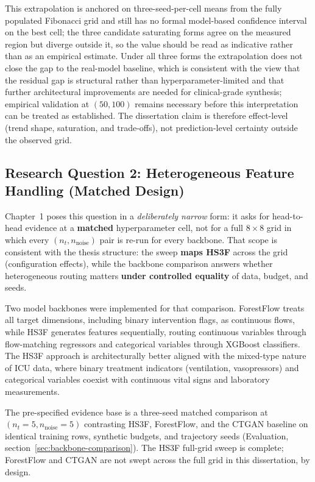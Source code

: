 This extrapolation is anchored on three-seed-per-cell means from the fully populated Fibonacci grid and still has no formal model-based confidence interval on the best cell; the three candidate saturating forms agree on the measured region but diverge outside it, so the value should be read as indicative rather than as an empirical estimate. Under all three forms the extrapolation does not close the gap to the real-model baseline, which is consistent with the view that the residual gap is structural rather than hyperparameter-limited and that further architectural improvements are needed for clinical-grade synthesis; empirical validation at $(50, 100)$ remains necessary before this interpretation can be treated as established. The dissertation claim is therefore effect-level (trend shape, saturation, and trade-offs), not prediction-level certainty outside the observed grid.

\subsection{Research Question 2: Heterogeneous Feature Handling (Matched Design)}

Chapter~1 poses this question in a \emph{deliberately narrow} form: it asks for head-to-head evidence at a \textbf{matched} hyperparameter cell, not for a full $8 \times 8$ grid in which every $(n_t, n_{\text{noise}})$ pair is re-run for every backbone. That scope is consistent with the thesis structure: the sweep \textbf{maps HS3F} across the grid (configuration effects), while the backbone comparison answers whether heterogeneous routing matters \textbf{under controlled equality} of data, budget, and seeds.

Two model backbones were implemented for that comparison. ForestFlow treats all target dimensions, including binary intervention flags, as continuous flows, while HS3F generates features sequentially, routing continuous variables through flow-matching regressors and categorical variables through XGBoost classifiers. The HS3F approach is architecturally better aligned with the mixed-type nature of ICU data, where binary treatment indicators (ventilation, vasopressors) and categorical variables coexist with continuous vital signs and laboratory measurements.

The pre-specified evidence base is a three-seed matched comparison at $(n_t{=}5, n_{\text{noise}}{=}5)$ contrasting HS3F, ForestFlow, and the CTGAN baseline on identical training rows, synthetic budgets, and trajectory seeds (Evaluation, section~\ref{sec:backbone-comparison}). The HS3F full-grid sweep is complete; ForestFlow and CTGAN are not swept across the full grid in this dissertation, by design.


